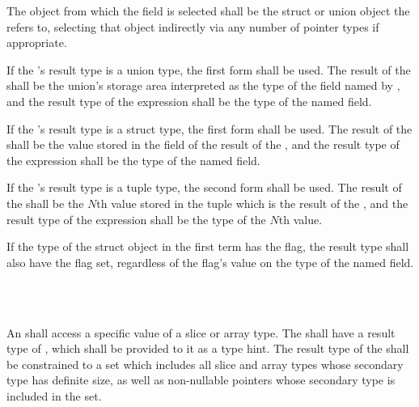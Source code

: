 
\specsubsubitem
The object from which the field is selected shall be the struct or union object
the  refers to, selecting that object indirectly
via any number of pointer types if appropriate.

\specsubsubitem
If the 's result type is a union type, the
first form shall be used. The result of the
 shall be the union's storage area
interpreted as the type of the field named by , and the
result type of the expression shall be the type of the named field.

\specsubsubitem
If the 's result type is a struct type, the
first form shall be used. The result of the
 shall be the value stored in the
 field of the result of the ,
and the result type of the expression shall be the type of the named field.

\specsubsubitem
If the 's result type is a tuple type,
the second form shall be used. The result of the
 shall be the $N$th value stored in the
tuple which is the result of the , and the
result type of the expression shall be the type of the $N$th value.

\specsubsubitem
If the type of the struct object in the first term has the 
flag, the result type shall also have the  flag set, regardless
of the flag's value on the type of the named field.


\begin{grammar}
 \\
	 \terminal{[}  \terminal{]} \\
\end{grammar}

\specsubsubitem
An  shall access a specific value of a slice
or array type. The  shall have a result type of
, which shall be provided to it as a type hint. The result type
of the  shall be constrained to a set which
includes all slice and array types whose secondary type has definite size, as
well as non-nullable pointers whose secondary type is included in the set.

